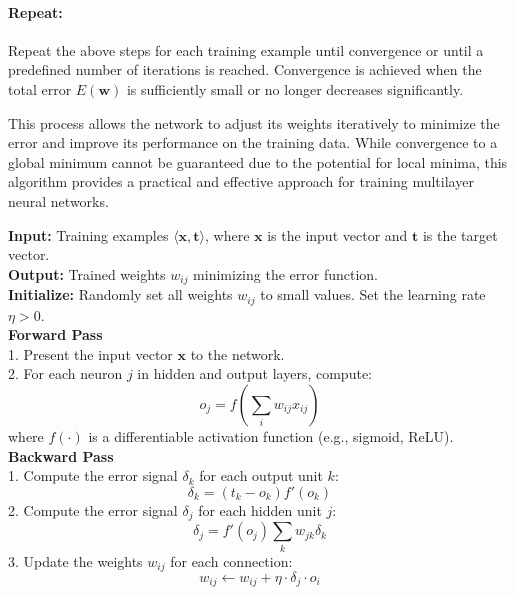 \documentclass{tufte-handout}
\begin{document}
\paragraph{Repeat:}
Repeat the above steps for each training example until convergence or until a predefined number of iterations is reached. Convergence is achieved when the total error $E(\mathbf{w})$ is sufficiently small or no longer decreases significantly.

This process allows the network to adjust its weights iteratively to minimize the error and improve its performance on the training data. While convergence to a global minimum cannot be guaranteed due to the potential for local minima, this algorithm provides a practical and effective approach for training multilayer neural networks.

\begin{algorithm}[h]
    \caption{Backpropagation Algorithm}
        \textbf{Input:} Training examples $\langle \mathbf{x}, \mathbf{t} \rangle$, where $\mathbf{x}$ is the input vector and $\mathbf{t}$ is the target vector. \\
        \textbf{Output:} Trained weights $w_{ij}$ minimizing the error function. \\
        \textbf{Initialize:} Randomly set all weights $w_{ij}$ to small values. Set the learning rate $\eta > 0$. \\
        
        \textbf{Forward Pass} \\
        1. Present the input vector $\mathbf{x}$ to the network. \\
        2. For each neuron $j$ in hidden and output layers, compute: \\
        \begin{equation*}
            o_j = f\left(\sum_i w_{ij} x_{ij}\right)
        \end{equation*}
        where $f(\cdot)$ is a differentiable activation function (e.g., sigmoid, ReLU). \\
        
        \textbf{Backward Pass} \\
        1. Compute the error signal $\delta_k$ for each output unit $k$: \\
        \begin{equation*}
            \delta_k = (t_k - o_k) f'(o_k)
        \end{equation*}
        2. Compute the error signal $\delta_j$ for each hidden unit $j$: \\
        \begin{equation*}
            \delta_j = f'(o_j) \sum_k w_{jk} \delta_k
        \end{equation*}
        3. Update the weights $w_{ij}$ for each connection: \\
        \begin{equation*}
            w_{ij} \leftarrow w_{ij} + \eta \cdot \delta_j \cdot o_i
        \end{equation*}


\end{algorithm}
\end{document}
